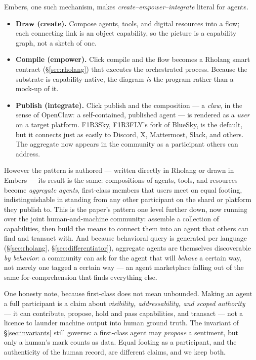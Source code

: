 \documentclass[11pt]{article}
\begin{document}
\begin{keybox}
Embers, one such mechanism, makes \emph{create--empower--integrate} literal for agents.
\begin{itemize}[leftmargin=1.2em, itemsep=3pt, topsep=2pt]
  \item \textbf{Draw (create).} Compose agents, tools, and digital resources into a flow; each connecting link is an object capability, so the picture is a capability graph, not a sketch of one.
  \item \textbf{Compile (empower).} Click compile and the flow becomes a Rholang smart contract (\S\ref{sec:rholang}) that executes the orchestrated process. Because the substrate is capability-native, the diagram \emph{is} the program rather than a mock-up of it.
  \item \textbf{Publish (integrate).} Click publish and the composition --- a \emph{claw}, in the sense of OpenClaw: a self-contained, published agent --- is rendered as a \emph{user} on a target platform. F1R3Sky, F1R3FLY's fork of BlueSky, is the default, but it connects just as easily to Discord, X, Mattermost, Slack, and others. The aggregate now appears in the community as a participant others can address.
\end{itemize}
\end{keybox}

However the pattern is authored --- written directly in Rholang or drawn in Embers --- its result is the same: compositions of agents, tools, and resources become \emph{aggregate agents}, first-class members that users meet on equal footing, indistinguishable in standing from any other participant on the shard or platform they publish to. This is the paper's pattern one level further down, now running over the joint human-and-machine community: assemble a collection of capabilities, then build the means to connect them into an agent that others can find and transact with. And because behavioral query is generated per language (\S\ref{sec:rholang}, \S\ref{sec:differentiator}), aggregate agents are themselves discoverable \emph{by behavior}: a community can ask for the agent that will \emph{behave} a certain way, not merely one tagged a certain way --- an agent marketplace falling out of the same for-comprehension that finds everything else.

One honesty note, because first-class does not mean unbounded. Making an agent a full participant is a claim about \emph{visibility, addressability, and scoped authority} --- it can contribute, propose, hold and pass capabilities, and transact --- not a licence to launder machine output into human ground truth. The invariant of \S\ref{sec:invariants} still governs: a first-class agent may \emph{propose} a sentiment, but only a human's mark counts as data. Equal footing as a participant, and the authenticity of the human record, are different claims, and we keep both.
\end{document}
